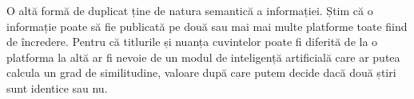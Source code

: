 O altă formă de duplicat ține de natura semantică a informației. Știm că o informație poate să fie publicată pe două sau mai mai multe platforme toate fiind de încredere. Pentru că titlurile și nuanța cuvintelor poate fi diferită de la o platforma la altă ar fi nevoie de un modul de inteligență artificială care ar putea calcula un grad de similitudine, valoare după care putem decide dacă două știri sunt identice sau nu.\\
